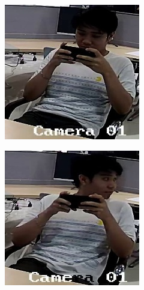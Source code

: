 \begin{figure}[!ht]
\begin{subfigure}[b]{0.45\linewidth}
    \end{subfigure}
    \begin{subfigure}[b]{0.45\linewidth}
      \includegraphics[width=\linewidth]{appendix/answer_phone/000_CXS0_D0_001293.jpg}
    \end{subfigure}
    \begin{subfigure}[b]{0.45\linewidth}
      \includegraphics[width=\linewidth]{appendix/answer_phone/000_CXS0_D0_001791.jpg}

\end{subfigure}
\end{figure}
